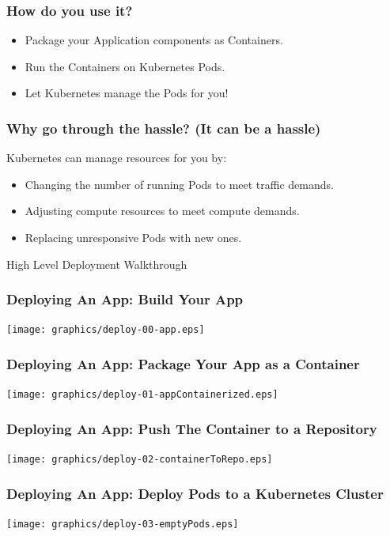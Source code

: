     \begin{frame}
        \frametitle{How do you use it?}
        \begin{itemize}
            \item{Package your Application components as Containers.}\pause
            \item{Run the Containers on Kubernetes Pods.}\pause
            \item{Let Kubernetes manage the Pods for you!}
        \end{itemize}
    \end{frame}

    \begin{frame}
        \frametitle{Why go through the hassle? (It can be a hassle)}
        Kubernetes can manage resources for you by:\pause
        \begin{itemize}
            \item{Changing the number of running Pods to meet traffic demands.}\pause
            \item{Adjusting compute resources to meet compute demands.}\pause
            \item{Replacing unresponsive Pods with new ones.}
        \end{itemize}
    \end{frame}

    \begin{frame}
        \begin{center}
            \Huge High Level Deployment Walkthrough
        \end{center}
    \end{frame}

    \begin{frame}
        \frametitle{Deploying An App: Build Your App}
        \texttt{[image: graphics/deploy-00-app.eps]}
    \end{frame}

    \begin{frame}
        \frametitle{Deploying An App: Package Your App as a Container}
        \texttt{[image: graphics/deploy-01-appContainerized.eps]}
    \end{frame}

    \begin{frame}
        \frametitle{Deploying An App: Push The Container to a Repository}
        \texttt{[image: graphics/deploy-02-containerToRepo.eps]}
    \end{frame}

    \begin{frame}
        \frametitle{Deploying An App: Deploy Pods to a Kubernetes Cluster}
        \texttt{[image: graphics/deploy-03-emptyPods.eps]}
    \end{frame}

